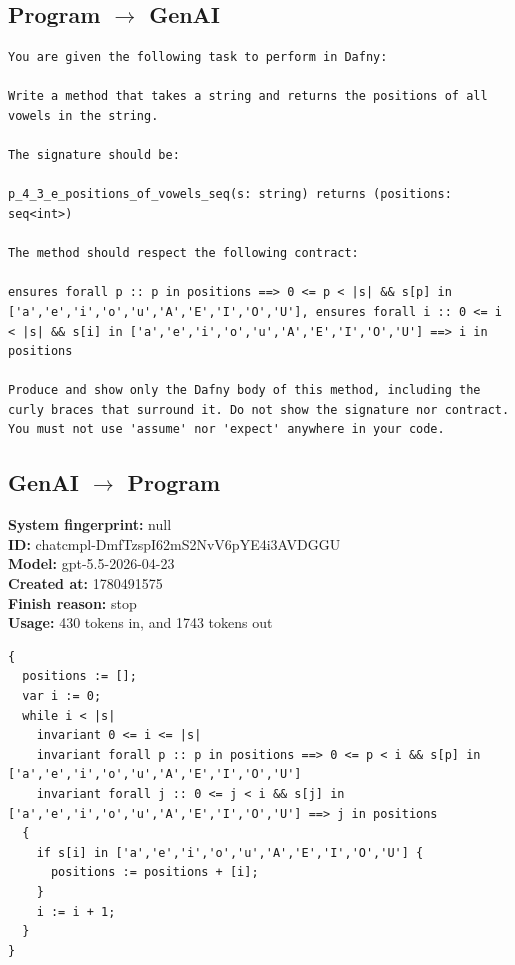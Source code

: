 \documentclass{article}
\begin{document}
\subsection*{Program $\rightarrow$ GenAI}
\begin{lstlisting}
You are given the following task to perform in Dafny:

Write a method that takes a string and returns the positions of all vowels in the string.

The signature should be:

p_4_3_e_positions_of_vowels_seq(s: string) returns (positions: seq<int>)

The method should respect the following contract:

ensures forall p :: p in positions ==> 0 <= p < |s| && s[p] in ['a','e','i','o','u','A','E','I','O','U'], ensures forall i :: 0 <= i < |s| && s[i] in ['a','e','i','o','u','A','E','I','O','U'] ==> i in positions

Produce and show only the Dafny body of this method, including the curly braces that surround it. Do not show the signature nor contract. You must not use 'assume' nor 'expect' anywhere in your code.
\end{lstlisting}
\subsection*{GenAI $\rightarrow$ Program}
\textbf{System fingerprint: }null
\\\textbf{ID: }chatcmpl-DmfTzspI62mS2NvV6pYE4i3AVDGGU
\\\textbf{Model: }gpt-5.5-2026-04-23
\\\textbf{Created at: }1780491575
\\\textbf{Finish reason: }stop
\\\textbf{Usage: }430 tokens in, and 1743 tokens out
\begin{lstlisting}
{
  positions := [];
  var i := 0;
  while i < |s|
    invariant 0 <= i <= |s|
    invariant forall p :: p in positions ==> 0 <= p < i && s[p] in ['a','e','i','o','u','A','E','I','O','U']
    invariant forall j :: 0 <= j < i && s[j] in ['a','e','i','o','u','A','E','I','O','U'] ==> j in positions
  {
    if s[i] in ['a','e','i','o','u','A','E','I','O','U'] {
      positions := positions + [i];
    }
    i := i + 1;
  }
}
\end{lstlisting}
\end{document}
